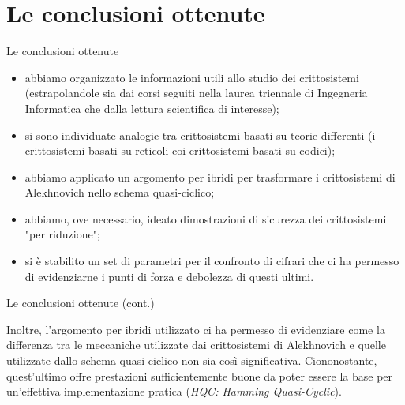\documentclass[10pt]{beamer}
\begin{document}
	\section{Le conclusioni ottenute}
		\begin{frame}{Le conclusioni ottenute}
			\begin{block}{}
				\begin{itemize}
					\item abbiamo organizzato le informazioni utili allo studio dei crittosistemi (estrapolandole sia dai corsi seguiti nella laurea triennale di Ingegneria Informatica che dalla lettura scientifica di interesse);
					\item si sono individuate analogie tra crittosistemi basati su teorie differenti (i crittosistemi basati su reticoli coi crittosistemi basati su codici);
					\item abbiamo applicato un argomento per ibridi per trasformare i crittosistemi di Alekhnovich nello schema quasi-ciclico;
					\item abbiamo, ove necessario, ideato dimostrazioni di sicurezza dei crittosistemi "per riduzione";
					\item si è stabilito un set di parametri per il confronto di cifrari che ci ha permesso di evidenziarne i punti di forza e debolezza di questi ultimi.
				\end{itemize}
			\end{block}
		\end{frame}
		\begin{frame}{Le conclusioni ottenute (cont.)}
			\begin{block}{}
				Inoltre, l'argomento per ibridi utilizzato ci ha permesso di evidenziare come la differenza tra le meccaniche utilizzate dai crittosistemi di Alekhnovich e quelle utilizzate dallo schema quasi-ciclico non sia così significativa. Ciononostante, quest'ultimo offre prestazioni sufficientemente buone da poter essere la base per un'effettiva implementazione pratica (\emph{HQC: Hamming Quasi-Cyclic}).
			\end{block}
		\end{frame}
\end{document}

